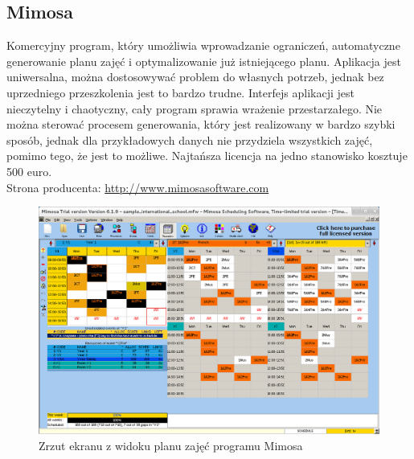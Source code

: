 \subsection{Mimosa}
Komercyjny program, który umożliwia wprowadzanie ograniczeń, automatyczne generowanie planu zajęć i optymalizowanie już istniejącego planu. Aplikacja jest uniwersalna, można dostosowywać problem do własnych potrzeb, jednak bez uprzedniego przeszkolenia jest to bardzo trudne. Interfejs aplikacji jest nieczytelny i chaotyczny, cały program sprawia wrażenie przestarzałego. Nie można sterować procesem generowania, który jest realizowany w bardzo szybki sposób, jednak dla przykładowych danych nie przydziela wszystkich zajęć, pomimo tego, że jest to możliwe. Najtańsza licencja na jedno stanowisko kosztuje 500 euro.\\
Strona producenta: \url{http://www.mimosasoftware.com}
\begin{figure}[H]
\includegraphics[width=15cm]{img/mimosa.png}
\caption{Zrzut ekranu z widoku planu zajęć programu Mimosa}
\end{figure}
